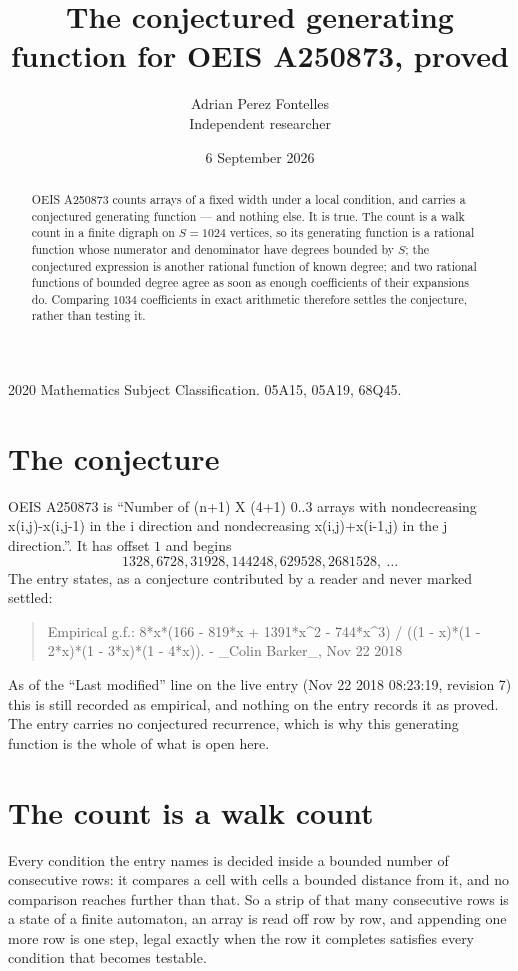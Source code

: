\documentclass[11pt,a4paper]{article}
\title{The conjectured generating function for OEIS A250873, proved}
\author{Adrian Perez Fontelles\\ \small Independent researcher}
\date{6 September 2026}
\theoremstyle{plain}
\theoremstyle{definition}
\begin{document}
\maketitle

\begin{abstract}
OEIS A250873 counts arrays of a fixed width under a local condition, and carries a conjectured
generating function --- and nothing else. It is true. The count is a walk count in a finite
digraph on $S=1024$ vertices, so its generating function is a rational function whose numerator
and denominator have degrees bounded by $S$; the conjectured expression is another rational
function of known degree; and two rational functions of bounded degree agree as soon as enough
coefficients of their expansions do. Comparing $1034$ coefficients in exact arithmetic
therefore settles the conjecture, rather than testing it.
\end{abstract}

\noindent\small 2020 Mathematics Subject Classification. 05A15, 05A19, 68Q45.\normalsize

\section{The conjecture}

OEIS A250873 is ``Number of (n+1) X (4+1) 0..3 arrays with nondecreasing x(i,j)-x(i,j-1) in the i direction and nondecreasing x(i,j)+x(i-1,j) in the j direction.''. It has offset $1$ and begins
\[
1328, 6728, 31928, 144248, 629528, 2681528,\ \dots
\]
The entry states, as a conjecture contributed by a reader and never marked settled:
\begin{quote}
Empirical g.f.: 8*x*(166 - 819*x + 1391*x\^{}2 - 744*x\^{}3) / ((1 - x)*(1 - 2*x)*(1 - 3*x)*(1 - 4*x)). - \_Colin Barker\_, Nov 22 2018
\end{quote}
As of the ``Last modified'' line on the live entry (Nov 22 2018 08:23:19, revision 7) this is still
recorded as empirical, and nothing on the entry records it as proved. The entry carries no
conjectured recurrence, which is why this generating function is the whole of what is open
here.

\section{The count is a walk count}

Every condition the entry names is decided inside a bounded number of consecutive rows: it
compares a cell with cells a bounded distance from it, and no comparison reaches further than
that. So a strip of that many consecutive rows is a state of a finite automaton, an array is
read off row by row, and appending one more row is one step, legal exactly when the row it
completes satisfies every condition that becomes testable.
\end{document}
